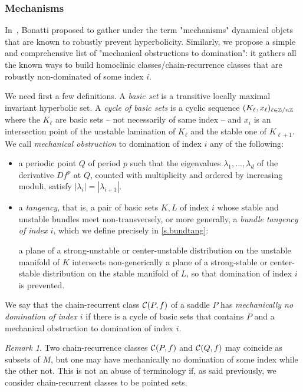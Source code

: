 \documentclass[11pt, a4paper]{amsart}
\theoremstyle{plain}
\theoremstyle{definition}
\theoremstyle{remark}
\newtheorem{remark}[proposition]{Remark}
\numberwithin{equation}{section}         %
\begin{document}
\subsubsection{Mechanisms}\label{s.mecha}
In~\cite{B}, Bonatti proposed to gather under the term "mechanisms" dynamical objets that are known to robustly prevent hyperbolicity. Similarly, we propose a simple and comprehensive list of "mechanical obstructions to domination": it gathers all the known ways to build homoclinic classes/chain-recurrence classes that are robustly non-dominated of some index $i$. 

We need first a few definitions. A {\em basic set} is a transitive locally maximal invariant hyperbolic set. A {\em cycle of basic sets} is a cyclic sequence $(K_\ell,x_\ell)_{\ell\in {\mathbb Z}/n{\mathbb Z}}$ where the $K_\ell$ are basic sets -- not necessarily of same index -- and $x_i$ is an intersection point of the unstable lamination of $K_\ell$ and the stable one of $K_{\ell+1}$.  We call {\em mechanical obstruction} to domination of index $i$ any of the following:
\begin{itemize}
\item a periodic point $Q$ of period $p$ such that the eigenvalues $\lambda_1,...,\lambda_d$ of the derivative $Df^p$ at $Q$, counted with multiplicity and ordered by increasing moduli, satisfy $|\lambda_i|=|\lambda_{i+1}|$.
\item a {\em tangency}, that is, a pair of basic sets $K,L$ of index $i$ whose stable and unstable bundles meet non-transversely, or more generally, a {\em bundle tangency of index $i$}, which we define precisely in \cref{s.bundtang}: 

a plane of a strong-unstable or center-unstable distribution on the unstable manifold of $K$ intersects non-generically a plane of a strong-stable or center-stable distribution on the stable manifold of $L$, so that domination of index $i$ is prevented.
\end{itemize}
We say that the chain-recurrent class ${\mathcal C}(P,f)$ of a saddle $P$ has {\em mechanically no domination of index $i$} if there is a cycle of basic sets that contains $P$ and a mechanical obstruction to domination of index $i$. 

\begin{remark}
Two chain-recurrence classes ${\mathcal C}(P,f)$ and ${\mathcal C}(Q,f)$ may coincide as subsets of $M$, but one may have mechanically no domination of some index while the other not. This is not an abuse of terminology if, as said previously, we consider chain-recurrent classes to be pointed sets.
\end{remark}
\end{document}
